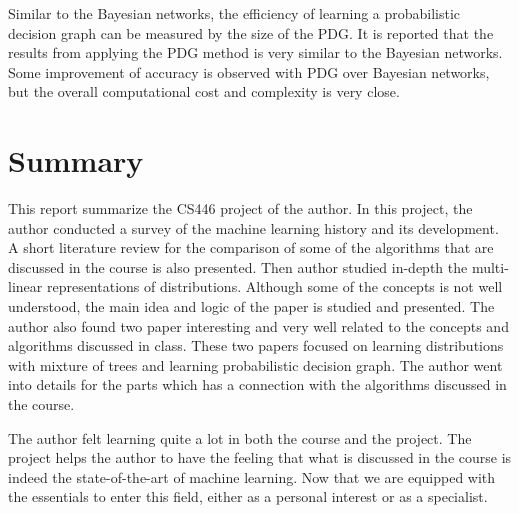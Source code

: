 \documentclass[11pt]{article}
\begin{document}
Similar to the Bayesian networks, the efficiency of learning a probabilistic decision graph can be measured by the size of the PDG. It is reported that the results from applying the PDG method is very similar to the Bayesian networks. Some improvement of accuracy is observed with PDG over Bayesian networks, but the overall computational cost and complexity is very close. 

\section{Summary}
This report summarize the CS446 project of the author. In this project, the author conducted a survey of the machine learning history and its development. A short literature review for the comparison of some of the algorithms that are discussed in the course is also presented. Then author studied in-depth the multi-linear representations of distributions. Although some of the concepts is not well understood, the main idea and logic of the paper is studied and presented. The author also found two paper interesting and very well related to the concepts and algorithms discussed in class. These two papers focused on learning distributions with mixture of trees and learning probabilistic decision graph. The author went into details for the parts which has a connection with the algorithms discussed in the course.

The author felt learning quite a lot in both the course and the project. The project helps the author to have the feeling that what is discussed in the course is indeed the state-of-the-art of machine learning. Now that we are equipped with the essentials to enter this field, either as a personal interest or as a specialist. 


\end{document}

